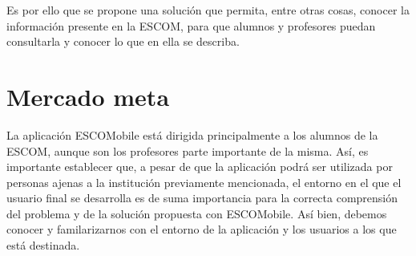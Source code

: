 \noindent 
\newline
Es por ello que se propone una solución que permita, entre otras cosas, conocer la información presente en la ESCOM, para que alumnos y profesores puedan consultarla y conocer lo que en ella se describa. 

\section{Mercado meta}

\noindent
La aplicación ESCOMobile está dirigida principalmente a los alumnos de la ESCOM, aunque son los profesores parte importante de la misma. Así, es importante establecer que, a pesar de que la aplicación podrá ser utilizada por personas ajenas a la institución previamente mencionada, el entorno en el que el usuario final se desarrolla es de suma importancia para la correcta comprensión del problema y de la solución propuesta con ESCOMobile. Así bien, debemos conocer y familarizarnos con el entorno de la aplicación y los usuarios a los que está destinada. 

